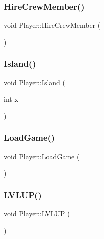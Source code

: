 \mbox{\label{class_player_a9a4c059e7aa94a6ee4152351af9d9edd}} 
\subsubsection{\texorpdfstring{Hire\+Crew\+Member()}{HireCrewMember()}}
{\footnotesize\ttfamily void Player\+::\+Hire\+Crew\+Member (\begin{DoxyParamCaption}{ }\end{DoxyParamCaption})}

\mbox{\label{class_player_afc2b87dc8abe8dfc5ea7f62503e18810}} 
\subsubsection{\texorpdfstring{Island()}{Island()}}
{\footnotesize\ttfamily void Player\+::\+Island (\begin{DoxyParamCaption}\item[{int}]{x }\end{DoxyParamCaption})}

\mbox{\label{class_player_a8eaaa47114a8c0f3be2d81b3949ce728}} 
\subsubsection{\texorpdfstring{Load\+Game()}{LoadGame()}}
{\footnotesize\ttfamily void Player\+::\+Load\+Game (\begin{DoxyParamCaption}{ }\end{DoxyParamCaption})}

\mbox{\label{class_player_af9c0820574406f3d4db31bf006aa368d}} 
\subsubsection{\texorpdfstring{L\+V\+L\+U\+P()}{LVLUP()}}
{\footnotesize\ttfamily void Player\+::\+L\+V\+L\+UP (\begin{DoxyParamCaption}{ }\end{DoxyParamCaption})\hspace{0.3cm}{\ttfamily [inline]}}

